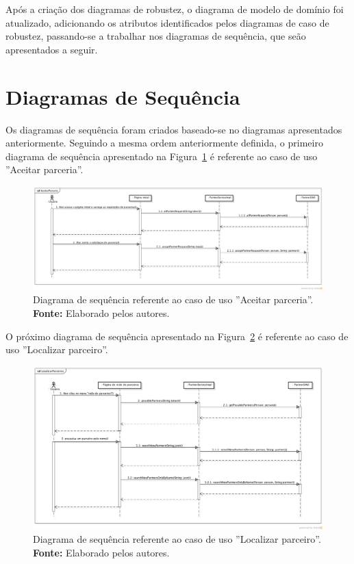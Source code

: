Após a criação dos diagramas de robustez, o diagrama de modelo de domínio foi atualizado, adicionando os atributos identificados pelos diagramas de caso de robustez, passando-se a trabalhar nos diagramas de sequência, que seão apresentados a seguir.

\section*{Diagramas de Sequência}

Os diagramas de sequência foram criados baseado-se no diagramas apresentados anteriormente. Seguindo a mesma ordem anteriormente definida, o primeiro diagrama de sequência apresentado na Figura~\ref{fig:ap1:diagrama_sequencia_aceitar_parceria} é referente ao caso de uso ''Aceitar parceria''.

\newpage
\captionsetup[figure]{list=no}
\begin{figure}[h!]
	\centerline{\includegraphics[angle=90,scale=0.42]{./imagens/apendices/diagrama-sequencia-aceitar-parceria.png}}
	\caption[Diagrama de sequência referente ao caso de uso ''Aceitar parceria''.]
	{Diagrama de sequência referente ao caso de uso ''Aceitar parceria''. \textbf{Fonte:} Elaborado pelos autores.}
	\label{fig:ap1:diagrama_sequencia_aceitar_parceria}
\end{figure}

O próximo diagrama de sequência apresentado na Figura~\ref{fig:ap1:diagrama_sequencia_localizar_parceiro} é referente ao caso de uso ''Localizar parceiro''.

\newpage
\captionsetup[figure]{list=no}
\begin{figure}[h!]
	\centerline{\includegraphics[angle=90,scale=0.42]{./imagens/apendices/diagrama-sequencia-localizar-parceiros.png}}
	\caption[Diagrama de sequência referente ao caso de uso ''Localizar parceiro''.]
	{Diagrama de sequência referente ao caso de uso ''Localizar parceiro''. \textbf{Fonte:} Elaborado pelos autores.}
	\label{fig:ap1:diagrama_sequencia_localizar_parceiro}
\end{figure}

